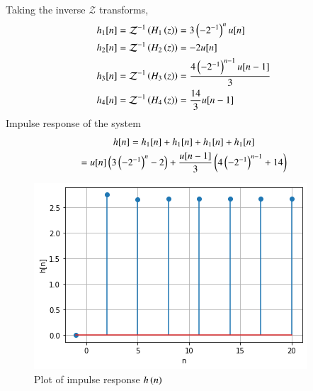 \documentclass[journal,12pt,twocolumn]{IEEEtran}
\begin{document}
Taking the inverse $\mathcal{Z}$ transforms,
\begin{align}
    h_1[n] &= \mathcal{Z}^{-1}\left(H_1\left(z\right)\right) = 3\left(-2^{-1}\right)^{n}u[n]\\
    h_2[n] &= \mathcal{Z}^{-1}\left(H_2\left(z\right)\right) = -2u[n]\\
    h_3[n] &= \mathcal{Z}^{-1}\left(H_3\left(z\right)\right) = \frac{4\left(-2^{-1}\right)^{n-1}u[n-1]}{3}\\
    h_4[n] &= \mathcal{Z}^{-1}\left(H_4\left(z\right)\right) = \frac{14}{3}u[n-1]
\end{align}
Impulse response of the system
\begin{multline}
    h[n] = h_1[n]+ h_1[n] + h_1[n] + h_1[n] \\= u[n]\left(3\left(-2^{-1}\right)^n-2\right) + \frac{u[n-1]}{3}\left(4\left(-2^{-1}\right)^{n-1} + 14\right)
\end{multline}
\begin{figure}[h]
    \centering
    \includegraphics[width=\columnwidth]{signal.png}
    \caption{Plot of impulse response $h\left(n\right)$}
    \label{fig:figure2}
\end{figure}
\end{document}
